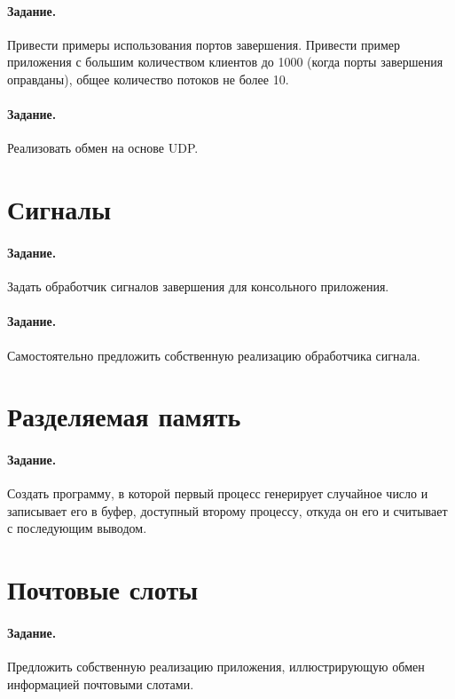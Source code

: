 \paragraph{Задание.} Привести примеры использования портов завершения. Привести пример приложения с большим количеством клиентов до 1000 (когда порты завершения оправданы), общее количество потоков не более 10.

\paragraph{Задание.} Реализовать обмен на основе UDP.

\section{Сигналы}

\paragraph{Задание.} Задать обработчик сигналов завершения для консольного приложения.

\paragraph{Задание.} Самостоятельно предложить собственную реализацию обработчика сигнала.

\section{Разделяемая память}

\paragraph{Задание.} Создать программу, в которой первый процесс генерирует случайное число и записывает его в буфер, доступный второму процессу, откуда он его и считывает с последующим выводом.

\section{Почтовые слоты}

\paragraph{Задание.} Предложить собственную реализацию приложения, иллюстрирующую обмен информацией почтовыми слотами.

